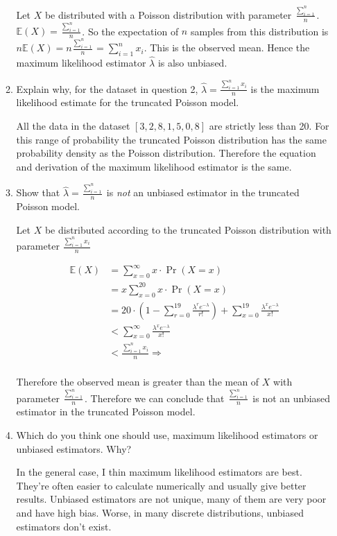 \documentclass[10pt,\jkfside,a4paper]{article}
\begin{document}
\begin{enumerate}
\begin{enumerate}
Let $X$ be distributed with a Poisson distribution with parameter
$\frac{\sum^n_{i=1}}{n}$. $\mathbb{E}\left( X \right) = \frac{\sum^n_{i=1}}{n}$.
So the expectation of $n$ samples from this distribution is
$n\mathbb{E}\left( X \right) = n\frac{\sum^n_{i=1}}{n} = \sum^n_{i=1} x_i$.
This is the observed mean. Hence the maximum likelihood estimator
$\hat{\lambda}$ is also unbiased.

\item Explain why, for the dataset in question 2, $\hat{\lambda} =
\frac{\sum^n_{i=1}x_i}{n} $ is the maximum likelihood estimate for the
truncated Poisson model.

All the data in the dataset $[3, 2, 8, 1, 5, 0, 8]$ are strictly less than
20. For this range of probability the truncated Poisson distribution has the
same probability density as the Poisson distribution. Therefore the equation
and derivation of the maximum likelihood estimator is the same.

\item Show that $\hat{\lambda} = \frac{\sum^n_{i=1}}{n}$ is \textit{not} an
unbiased estimator in the truncated Poisson model.

Let $X$ be distributed according to the truncated Poisson distribution with
parameter $\frac{\sum^n_{i=1}x_i}{n}$

\[
\begin{split}
\mathbb{E}\left( X \right) &=
\sum^{\infty}_{x=0} x \cdot \Pr(X = x) \\
&=x
\sum^{20}_{x=0} x \cdot \Pr(X = x) \\
&= 20\cdot \left( 1 - \sum^{19}_{r=0}\frac{\lambda^r e^{-\lambda}}{r!}
\right) + \sum^{19}_{x=0} \frac{\lambda^x e^{-\lambda}}{x!} \\
&< \sum^{\infty}_{x=0} \frac{\lambda^x e^{-\lambda}}{x!} \\
&< \frac{\sum^n_{i=1}x_i}{n} \Longrightarrow \\
\end{split}
\]

Therefore the observed mean is greater than the mean of $X$ with parameter
$\frac{\sum^n_{i=1}}{n}$. Therefore we can conclude that
$\frac{\sum^n_{i=1}}{n}$ is not an unbiased estimator in the truncated
Poisson model.

\item Which do you think one should use, maximum likelihood estimators or
unbiased estimators. Why?

In the general case, I thin maximum likelihood estimators are best. They're
often easier to calculate numerically and usually give better results. Unbiased
estimators are not unique, many of them are very poor and have high bias.
Worse, in many discrete distributions, unbiased estimators don't exist.


\end{enumerate}
\end{enumerate}
\end{document}

